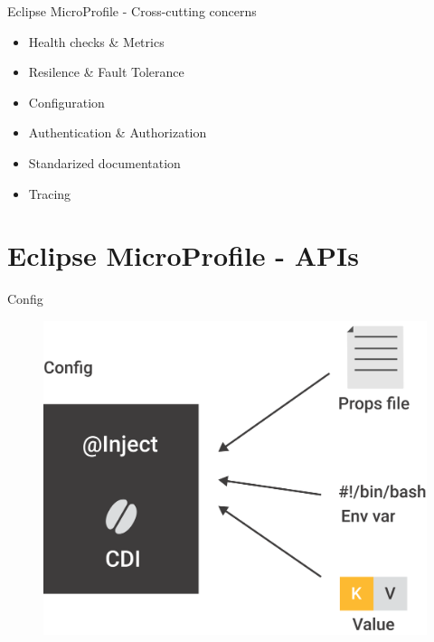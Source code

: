 \documentclass[aspectratio=169]{beamer}
\begin{document}
\begin{frame}{Eclipse MicroProfile - Cross-cutting concerns}

\begin{itemize}
	\item Health checks \& Metrics
	\item Resilence \& Fault Tolerance
	\item Configuration
	\item Authentication \& Authorization
	\item Standarized documentation
    \item Tracing
\end{itemize}

\end{frame}


{
    \section{Eclipse MicroProfile - APIs}
}

\begin{frame}{Config}
\begin{figure}
	\centering
	\includegraphics[width=0.65\linewidth]{Images/config}
\end{figure}
\end{frame}
\end{document}
